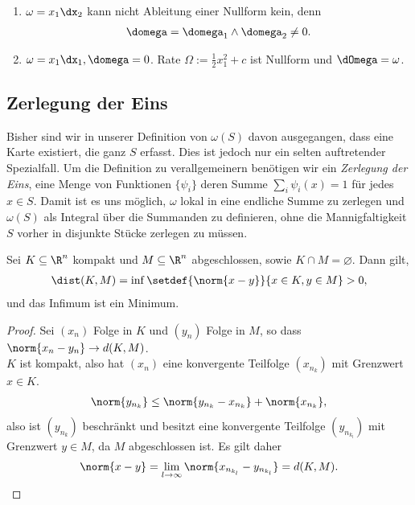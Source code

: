 \begin{bsp}
\label{bsp:4.41}
\begin{enumerate}[label=\arabic{*}.)]
  \item $\omega = x_1\dx_2$ kann nicht Ableitung einer Nullform kein, denn
\begin{align*}
\domega = \domega_1\land\domega_2 \neq 0.
\end{align*}
  \item $\omega = x_1\dx_1, \domega = 0$. Rate $\Omega := \frac{1}{2}x_1^2+c$
  ist Nullform und $\dOmega = \omega$.
\end{enumerate}
\end{bsp}

\subsection{Zerlegung der Eins}

Bisher sind wir in unserer Definition von $\omega(S)$ davon ausgegangen, dass
eine Karte existiert, die ganz $S$ erfasst. Dies ist jedoch nur ein selten
auftretender Spezialfall. Um die Definition zu verallgemeinern benötigen wir
ein \emph{Zerlegung der Eins}, eine Menge von Funktionen $\{\psi_i\}$ deren
Summe $\sum_i \psi_i(x) = 1$ für jedes $x\in S$. Damit ist es
uns möglich, $\omega$ lokal in eine endliche Summe zu zerlegen und $\omega(S)$
als Integral über die Summanden zu definieren, ohne die Mannigfaltigkeit
$S$ vorher in disjunkte Stücke zerlegen zu müssen.

\begin{lem}
\label{prop:4.42}
Sei $K\subseteq\R^n$ kompakt und $M\subseteq\R^n$ abgeschlossen, sowie $K\cap M
= \varnothing$. Dann gilt,
\begin{align*}
\dist(K,M) = \inf\setdef{\norm{x-y}}{x\in K,y\in M} > 0,
\end{align*}
und das Infimum ist ein Minimum.\fishhere
\end{lem}
\begin{proof}
Sei $(x_n)$ Folge in $K$ und $(y_n)$ Folge in $M$, so dass
$\norm{x_n-y_n}\to d(K,M)$.\\
$K$ ist kompakt, also hat $(x_n)$ eine konvergente Teilfolge $(x_{n_k})$ mit
Grenzwert $x\in K$.
\begin{align*}
\norm{y_{n_k}} \le \norm{y_{n_k}-x_{n_k}}+\norm{x_{n_k}},
\end{align*}
also ist $(y_{n_k})$ beschränkt und besitzt eine konvergente Teilfolge
$(y_{n_{k_l}})$ mit Grenzwert $y\in M$, da $M$ abgeschlossen ist. Es gilt daher
\begin{align*}
\norm{x-y} = \lim\limits_{l\to\infty}\norm{x_{n_{k_l}}-y_{n_{k_l}}} =
d(K,M).\qedhere
\end{align*}
\end{proof}

